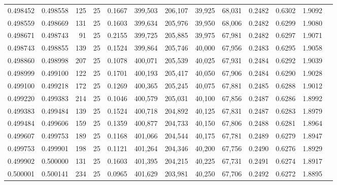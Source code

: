 \begin{tabular}{rrrrrrrrrrrrr}
0.498452 & 0.498558 &   125 &  25 &                                     0.1667 & 399,503 & 206,107 &  39,925 &  68,031 & 0.2482 & 0.6302 & 1.9092 \\
0.498559 & 0.498669 &   131 &  25 &                                     0.1603 & 399,634 & 205,976 &  39,950 &  68,006 & 0.2482 & 0.6299 & 1.9080 \\
0.498671 & 0.498743 &    91 &  25 &                                     0.2155 & 399,725 & 205,885 &  39,975 &  67,981 & 0.2482 & 0.6297 & 1.9071 \\
0.498743 & 0.498855 &   139 &  25 &                                     0.1524 & 399,864 & 205,746 &  40,000 &  67,956 & 0.2483 & 0.6295 & 1.9058 \\
0.498860 & 0.498998 &   207 &  25 &                                     0.1078 & 400,071 & 205,539 &  40,025 &  67,931 & 0.2484 & 0.6292 & 1.9039 \\
0.498999 & 0.499100 &   122 &  25 &                                     0.1701 & 400,193 & 205,417 &  40,050 &  67,906 & 0.2484 & 0.6290 & 1.9028 \\
0.499100 & 0.499218 &   172 &  25 &                                     0.1269 & 400,365 & 205,245 &  40,075 &  67,881 & 0.2485 & 0.6288 & 1.9012 \\
0.499220 & 0.499383 &   214 &  25 &                                     0.1046 & 400,579 & 205,031 &  40,100 &  67,856 & 0.2487 & 0.6286 & 1.8992 \\
0.499383 & 0.499484 &   139 &  25 &                                     0.1524 & 400,718 & 204,892 &  40,125 &  67,831 & 0.2487 & 0.6283 & 1.8979 \\
0.499484 & 0.499606 &   159 &  25 &                                     0.1359 & 400,877 & 204,733 &  40,150 &  67,806 & 0.2488 & 0.6281 & 1.8964 \\
0.499607 & 0.499753 &   189 &  25 &                                     0.1168 & 401,066 & 204,544 &  40,175 &  67,781 & 0.2489 & 0.6279 & 1.8947 \\
0.499753 & 0.499901 &   198 &  25 &                                     0.1121 & 401,264 & 204,346 &  40,200 &  67,756 & 0.2490 & 0.6276 & 1.8929 \\
0.499902 & 0.500000 &   131 &  25 &                                     0.1603 & 401,395 & 204,215 &  40,225 &  67,731 & 0.2491 & 0.6274 & 1.8917 \\
0.500001 & 0.500141 &   234 &  25 &                                     0.0965 & 401,629 & 203,981 &  40,250 &  67,706 & 0.2492 & 0.6272 & 1.8895 \\

\end{tabular}
